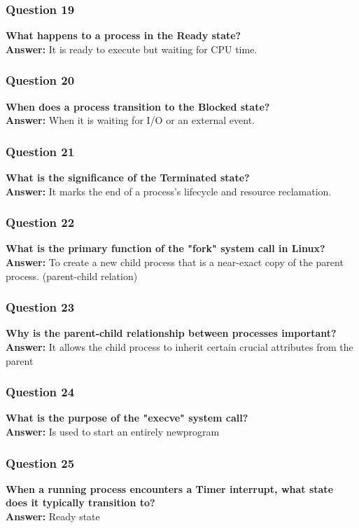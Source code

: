 \documentclass{article}
\begin{document}
\subsubsection*{Question 19}
\textbf{What happens to a process in the Ready state?} \\
\textbf{Answer:} It is ready to execute but waiting for CPU time.

\subsubsection*{Question 20}
\textbf{When does a process transition to the Blocked state?} \\
\textbf{Answer:} When it is waiting for I/O or an external event.

\subsubsection*{Question 21}
\textbf{What is the significance of the Terminated state?} \\
\textbf{Answer:} It marks the end of a process's lifecycle and resource reclamation.
 
\subsubsection*{Question 22}
\textbf{What is the primary function of the "fork" system call in Linux?} \\
\textbf{Answer:} To create a new child process that is a near-exact copy of the parent process. 
(parent-child relation)

\subsubsection*{Question 23}
\textbf{Why is the parent-child relationship between processes important?} \\
\textbf{Answer:} It allows the child process to inherit certain crucial attributes from the parent

\subsubsection*{Question 24}
\textbf{What is the purpose of the "execve" system call?} \\
\textbf{Answer:} Is used to start an entirely newprogram

\subsubsection*{Question 25}
\textbf{When a running process encounters a Timer interrupt, what state does it typically transition to?} \\
\textbf{Answer:} Ready state
\end{document}
